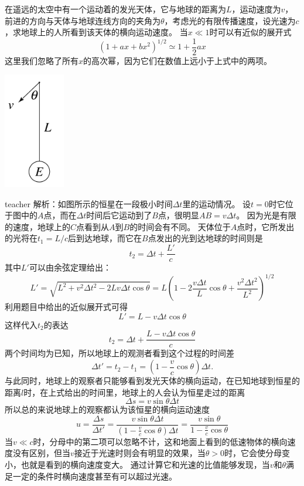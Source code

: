 \begin{example}
在遥远的太空中有一个运动着的发光天体，它与地球的距离为$L$，运动速度为$v$，前进的方向与天体与地球连线方向的夹角为$\theta$，考虑光的有限传播速度，设光速为$c$，求地球上的人所看到该天体的横向运动速度。
当$x\ll 1$时可以有近似的展开式
\[(1+ax+bx^2)^{1/2}\simeq 1+\frac{1}{2}ax\]
这里我们忽略了所有$x$的高次幂，因为它们在数值上远小于上式中的两项。
\begin{flushright}
\includegraphics[width=0.2\textwidth]{images/motion-problem-1.pdf}
\end{flushright}
\begin{taggedblock}{teacher}
\noindent
解析：如图所示的恒星在一段极小时间$\Delta t$里的运动情况。
设$t=0$时它位于图中的$A$点，而在$\Delta t$时间后它运动到了$B$点，很明显$AB = v\Delta t$。
因为光是有限的速度，地球上的$C$点看到从$A$到$B$的时间会有不同。
天体位于$A$点时，它所发出的光将在$t_1 = L/c$后到达地球，而它在$B$点发出的光到达地球的时间则是
\[t_2 = \Delta t+\frac{L'}{c}\]
其中$L'$可以由余弦定理给出：
\[L' = \sqrt{L^2+v^2\Delta t^2-2Lv\Delta t \cos \theta } = L\left( 1-2\frac{v\Delta t}{L}\cos\theta +\frac{v^2\Delta t^2}{L^2} \right)^{1/2}\]
利用题目中给出的近似展开式可得
\[  L' = L-v\Delta t\cos\theta\]
这样代入$t_2$的表达
\[t_2 = \Delta t +\frac{L-v\Delta t\cos\theta}{c}\]
两个时间均为已知，所以地球上的观测者看到这个过程的时间差
\[\Delta t' = t_2-t_1 = (1- \frac{v}{c}\cos\theta)\Delta t. \]
与此同时，地球上的观察者只能够看到发光天体的横向运动，在已知地球到恒星的距离$l$时，在上式给出的时间里，地球上的人会认为恒星走过的距离
\[ \Delta s = v\sin\theta\Delta t  \]
所以总的来说地球上的观察都认为该恒星的横向运动速度
\[ u = \frac{\Delta s}{\Delta t'}  = \frac{v\sin\theta\Delta t }{(1- \frac{v}{c}\cos\theta)\Delta t} = \frac{v\sin\theta }{1- \frac{v}{c}\cos\theta} \]
当$v\ll c$时，分母中的第二项可以忽略不计，这和地面上看到的低速物体的横向速度没有区别，但当$v$接近于光速时则会有明显的效果，当$\theta>0$时，它会使分母变小，也就是看到的横向速度变大。
通过计算它和光速的比值能够发现，当$v$和$\theta$满足一定的条件时横向速度甚至有可以超过光速。


\end{taggedblock}
\end{example}
